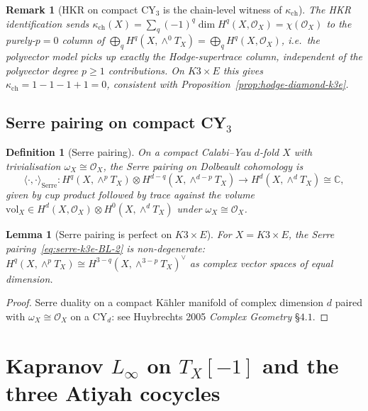 \documentclass[11pt]{article}
\newtheorem{lemma}[theorem]{Lemma}
\newtheorem{definition}[theorem]{Definition}
\newtheorem{remark}[theorem]{Remark}
\providecommand{\cO}{\mathcal{O}}
\providecommand{\CC}{\mathbb{C}}
\providecommand{\kch}{\kappa_{\mathrm{ch}}}
\begin{document}
\begin{remark}[HKR on compact CY$_3$ is the chain-level witness of $\kch$]
The HKR identification sends
$\kch(X) = \sum_q (-1)^q \dim H^q(X, \cO_X) = \chi(\cO_X)$ to the
purely-$p = 0$ column of $\bigoplus_q H^q(X, \wedge^0 T_X) = \bigoplus_q
H^q(X, \cO_X)$, i.e.\ the polyvector model picks up exactly the
Hodge-supertrace column, independent of the polyvector degree $p \geq 1$
contributions. On $K3 \times E$ this gives $\kch = 1 - 1 - 1 + 1 = 0$,
consistent with Proposition~\ref{prop:hodge-diamond-k3e}.
\end{remark}

\subsection{Serre pairing on compact CY$_3$}
\label{subsec:serre-k3e-BL-2}

\begin{definition}[Serre pairing]
\label{def:serre-k3e-BL-2}
On a compact Calabi--Yau $d$-fold $X$ with trivialisation
$\omega_X \cong \cO_X$, the Serre pairing on Dolbeault cohomology is
\begin{equation}
\label{eq:serre-k3e-BL-2}
  \langle \cdot, \cdot \rangle_{\mathrm{Serre}} \colon
  H^q(X, \wedge^p T_X) \otimes H^{d - q}(X, \wedge^{d - p} T_X)
  \longrightarrow H^d(X, \wedge^d T_X) \cong \CC,
\end{equation}
given by cup product followed by trace against the volume
$\mathrm{vol}_X \in H^d(X, \cO_X) \otimes H^0(X, \wedge^d T_X)$ under
$\omega_X \cong \cO_X$.
\end{definition}

\begin{lemma}[Serre pairing is perfect on $K3 \times E$]
\label{lem:serre-perfect-k3e-BL-2}
For $X = K3 \times E$, the Serre pairing~\eqref{eq:serre-k3e-BL-2}
is non-degenerate: $H^q(X, \wedge^p T_X) \cong H^{3 - q}(X, \wedge^{3 - p} T_X)^\vee$
as complex vector spaces of equal dimension.
\end{lemma}

\begin{proof}
Serre duality on a compact K\"ahler manifold of complex dimension $d$
paired with $\omega_X \cong \cO_X$ on a CY$_d$: see Huybrechts 2005
\emph{Complex Geometry} \S$4.1$.
\end{proof}

\section{Kapranov $L_\infty$ on $T_X[-1]$ and the three Atiyah cocycles}
\label{sec:kapranov-linfty}
\end{document}
